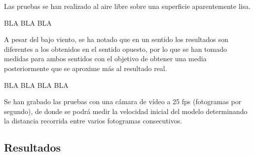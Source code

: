 Las pruebas se han realizado al aire libre sobre una superficie aparentemente lisa.

BLA BLA BLA

A pesar del bajo viento, se ha notado que en un sentido los resultados son diferentes a los obtenidos en el sentido opuesto, por lo que se han tomado medidas para ambos sentidos con el objetivo de obtener una media posteriormente que se aproxime más al resultado real.

BLA BLA BLA BLA

Se han grabado las pruebas con una cámara de vídeo a 25 fps (fotogramas por segundo), de donde se podrá medir la velocidad inicial del modelo determinando la distancia recorrida entre varios fotogramas consecutivos.


\FloatBarrier


\subsection{Resultados}
\label{sec:tests:results}


